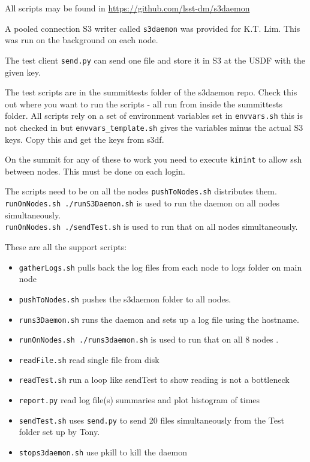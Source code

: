All scripts may be found in \url{https://github.com/lsst-dm/s3daemon}

A pooled connection S3 writer called {\tt s3daemon} was provided for K.T. Lim.
This was run on the background on each node.

The test client  {\tt send.py} can send one file and store it in S3 at the USDF with the given key.

The test scripts are in the summittests folder of the s3daemon repo.
Check this out where you want to run the scripts - all run from inside the summittests folder.
All scripts rely on a set of environment variables set in {\tt envvars.sh} this is not checked in but {\tt envvars\_template.sh} gives the variables minus the actual S3 keys. Copy this and get the keys from s3df.

On the summit for any of these to work you need to execute {\tt kinint} to allow ssh between nodes.
This must be done on each login.

The scripts need to be on all the nodes {\tt pushToNodes.sh} distributes them.\\
{\tt runOnNodes.sh ./runS3Daemon.sh} is used to run the daemon on all nodes simultaneously.\\
{\tt runOnNodes.sh ./sendTest.sh} is used to run that on all nodes simultaneously.

These  are all the support scripts:
\begin{itemize}
\item {\tt gatherLogs.sh} pulls back the log files from each node to logs folder on main node
\item {\tt pushToNodes.sh} pushes the s3daemon folder to all nodes.
\item {\tt runs3Daemon.sh} runs the daemon and sets up a log file using the hostname.
\item {\tt runOnNodes.sh ./runs3daemon.sh} is used to run that on all 8 nodes .
\item {\tt readFile.sh}  read  single file from disk
\item {\tt readTest.sh}  run a loop like sendTest to show reading is not a bottleneck
\item {\tt report.py}  read log file(s) summaries and plot histogram of times
\item {\tt sendTest.sh} uses {\tt send.py} to send 20 files simultaneously from the Test folder set up by Tony.
\item {\tt stops3daemon.sh}  use pkill to kill the daemon
\end{itemize}



